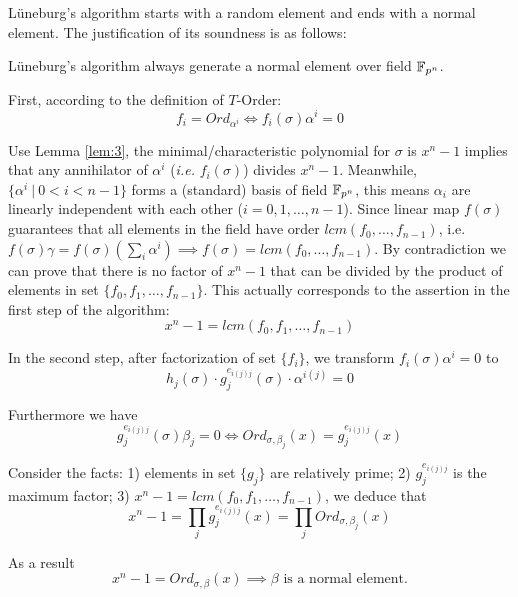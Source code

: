 L\"uneburg's algorithm starts with a random element and ends with a normal element. The justification of 
its soundness is as follows:
\begin{Proposition}
L\"uneburg's algorithm always generate a normal element over field ${\mathbb{F}}_{p^n}$.
\end{Proposition}

\begin{Proof}
First, according to the definition of $T$-Order:
$$f_i = Ord_{\alpha^i} \Leftrightarrow f_i(\sigma)\alpha^i = 0$$

Use Lemma \ref{lem:3}, the minimal/characteristic polynomial for $\sigma$ is $x^n-1$ implies that
any annihilator of $\alpha^i$ ({\it i.e.} $f_i(\sigma)$) divides $x^n-1$. Meanwhile, $\{\alpha^i~|~0<i<n-1\}$ forms a (standard) basis
of field ${\mathbb{F}}_{p^n}$, this means $\alpha_i$ are linearly independent with each other ($i=0,1,\dots,n-1$).
Since linear map $f(\sigma)$ guarantees that all elements in the field 
have order $lcm(f_0,\dots,f_{n-1})$, i.e. $f(\sigma)\gamma = f(\sigma)(\sum_i \alpha^i) \implies f(\sigma) = lcm(f_0,\dots,f_{n-1})$.
By contradiction we can prove that there is no factor of $x^n-1$ that can be divided by the product 
of elements in set $\{f_0,f_1,\dots,f_{n-1}\}$. This actually corresponds to the assertion in the first step of the algorithm:
$$x^n-1 = lcm(f_0,f_1,\dots,f_{n-1})$$

In the second step, after factorization of set $\{f_i\}$, we transform $f_i(\sigma)\alpha^i=0$ to
$$h_j(\sigma)\cdot g_{j}^{e_{i(j)j}}(\sigma) \cdot \alpha^{i(j)} = 0$$

Furthermore we have 
$$g_{j}^{e_{i(j)j}}(\sigma)\beta_j = 0 \Leftrightarrow Ord_{\sigma,\beta_j}(x) = g_{j}^{e_{i(j)j}}(x)$$

Consider the facts: 1) elements in set $\{g_j\}$ are relatively prime; 2) $g_{j}^{e_{i(j)j}}$ is the maximum factor; 
3) $x^n-1 = lcm(f_0,f_1,\dots,f_{n-1})$, we deduce that 
$$x^n-1 = \prod_j g_{j}^{e_{i(j)j}}(x) = \prod_jOrd_{\sigma,\beta_j}(x)$$

As a result
$$x^n-1 = Ord_{\sigma,\beta}(x) \implies \beta\text{ is a normal element.}$$
\end{Proof}

